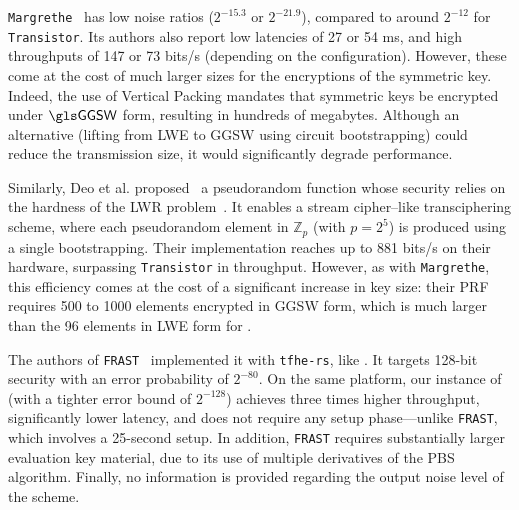 \texttt{Margrethe}~\cite{EPRINT:AGHM24} has low noise ratios ($2^{-15.3}$ or $2^{-21.9}$), compared to around $2^{-12}$ for \texttt{Transistor}. Its authors also report low latencies of 27 or 54 ms, and high throughputs of 147 or 73 bits/s (depending on the configuration). However, these come at the cost of much larger sizes for the encryptions of the symmetric key. Indeed, the use of Vertical Packing mandates that symmetric keys be encrypted under $\GGSW$ form, resulting in hundreds of megabytes. Although an alternative (lifting from LWE to GGSW using circuit bootstrapping) could reduce the transmission size, it would significantly degrade performance. 

Similarly, Deo et al. proposed~\cite{EPRINT:DJLCB24} a pseudorandom function whose security relies on the hardness of the LWR problem~\cite{EC:BanPeiRos12}. It enables a stream cipher–like transciphering scheme, where each pseudorandom element in $\mathbb{Z}_p$ (with $p=2^5$) is produced using a single bootstrapping. Their implementation reaches up to 881 bits/s on their hardware, surpassing \texttt{Transistor} in throughput. However, as with \texttt{Margrethe}, this efficiency comes at the cost of a significant increase in key size: their PRF requires 500 to 1000 elements encrypted in GGSW form, which is much larger than the 96 elements in LWE form for \coolName.


The authors of \texttt{FRAST}~\cite{ToSC:CCHLOS24} implemented it with \texttt{tfhe-rs}, like \coolName. It targets 128-bit security with an error probability of $2^{-80}$. On the same platform, our instance of \coolName (with a tighter error bound of $2^{-128}$) achieves three times higher throughput, significantly lower latency, and does not require any setup phase—unlike \texttt{FRAST}, which involves a 25-second setup. In addition, \texttt{FRAST} requires substantially larger evaluation key material, due to its use of multiple derivatives of the \gls{PBS} algorithm. Finally, no information is provided regarding the output noise level of the scheme.



